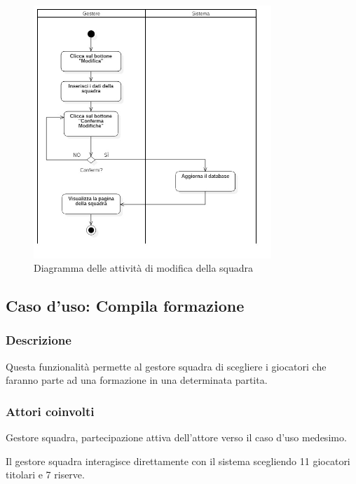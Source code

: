 %
%
\begin{figure}[h]
	\centering
	\includegraphics[width=0.8\textwidth]
	{immagini/ad-modifica-squadra}
	
	\caption{Diagramma delle attività di modifica della squadra}
	\label{ad-modifica-squadra}
\end{figure}


%
%
\subsection{Caso d'uso: Compila formazione}

\subsubsection*{Descrizione}
Questa funzionalità permette al gestore squadra di scegliere i giocatori che faranno parte ad una formazione in una determinata partita.

\subsubsection*{Attori coinvolti}
Gestore squadra, partecipazione attiva dell'attore verso il caso d'uso medesimo.

Il gestore squadra interagisce direttamente con il sistema scegliendo 11 giocatori titolari e 7 riserve.

